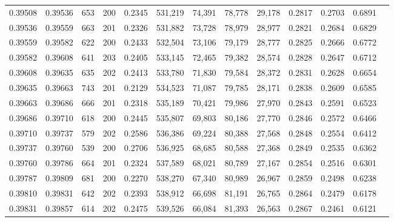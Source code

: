 \begin{tabular}{rrrrrrrrrrrrr}
0.39508 & 0.39536 &   653 & 200 &                                     0.2345 & 531,219 &  74,391 &  78,778 &  29,178 & 0.2817 & 0.2703 & 0.6891 \\
0.39536 & 0.39559 &   663 & 201 &                                     0.2326 & 531,882 &  73,728 &  78,979 &  28,977 & 0.2821 & 0.2684 & 0.6829 \\
0.39559 & 0.39582 &   622 & 200 &                                     0.2433 & 532,504 &  73,106 &  79,179 &  28,777 & 0.2825 & 0.2666 & 0.6772 \\
0.39582 & 0.39608 &   641 & 203 &                                     0.2405 & 533,145 &  72,465 &  79,382 &  28,574 & 0.2828 & 0.2647 & 0.6712 \\
0.39608 & 0.39635 &   635 & 202 &                                     0.2413 & 533,780 &  71,830 &  79,584 &  28,372 & 0.2831 & 0.2628 & 0.6654 \\
0.39635 & 0.39663 &   743 & 201 &                                     0.2129 & 534,523 &  71,087 &  79,785 &  28,171 & 0.2838 & 0.2609 & 0.6585 \\
0.39663 & 0.39686 &   666 & 201 &                                     0.2318 & 535,189 &  70,421 &  79,986 &  27,970 & 0.2843 & 0.2591 & 0.6523 \\
0.39686 & 0.39710 &   618 & 200 &                                     0.2445 & 535,807 &  69,803 &  80,186 &  27,770 & 0.2846 & 0.2572 & 0.6466 \\
0.39710 & 0.39737 &   579 & 202 &                                     0.2586 & 536,386 &  69,224 &  80,388 &  27,568 & 0.2848 & 0.2554 & 0.6412 \\
0.39737 & 0.39760 &   539 & 200 &                                     0.2706 & 536,925 &  68,685 &  80,588 &  27,368 & 0.2849 & 0.2535 & 0.6362 \\
0.39760 & 0.39786 &   664 & 201 &                                     0.2324 & 537,589 &  68,021 &  80,789 &  27,167 & 0.2854 & 0.2516 & 0.6301 \\
0.39787 & 0.39809 &   681 & 200 &                                     0.2270 & 538,270 &  67,340 &  80,989 &  26,967 & 0.2859 & 0.2498 & 0.6238 \\
0.39810 & 0.39831 &   642 & 202 &                                     0.2393 & 538,912 &  66,698 &  81,191 &  26,765 & 0.2864 & 0.2479 & 0.6178 \\
0.39831 & 0.39857 &   614 & 202 &                                     0.2475 & 539,526 &  66,084 &  81,393 &  26,563 & 0.2867 & 0.2461 & 0.6121 \\

\end{tabular}
